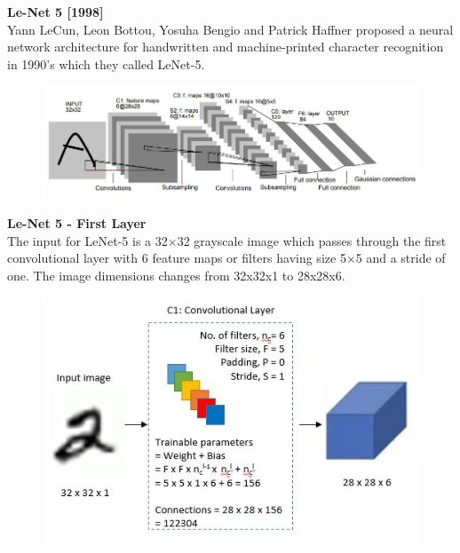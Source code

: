 \documentclass[10pt, compress]{beamer}
\begin{document}
\begin{frame}
  \vspace{0.6cm}
  \textbf{Le-Net 5 [1998]} \\
  Yann LeCun, Leon Bottou, Yosuha Bengio and Patrick Haffner proposed a neural network architecture for handwritten and machine-printed character recognition in 1990’s which they called LeNet-5.
  \begin{figure}
    \includegraphics[width=.9\linewidth]{imgs/cnn/lenet}
  \end{figure}
\end{frame}

\begin{frame}
  \vspace{0.6cm}
  \textbf{Le-Net 5 - First Layer} \\
  The input for LeNet-5 is a 32×32 grayscale image which passes through the first convolutional layer with 6 feature maps or filters having size 5×5 and a stride of one. The image dimensions changes from 32x32x1 to 28x28x6.
  \begin{figure}
    \includegraphics[width=.75\linewidth]{imgs/cnn/LeNet_Layer1}
  \end{figure}
\end{frame}
\end{document}
